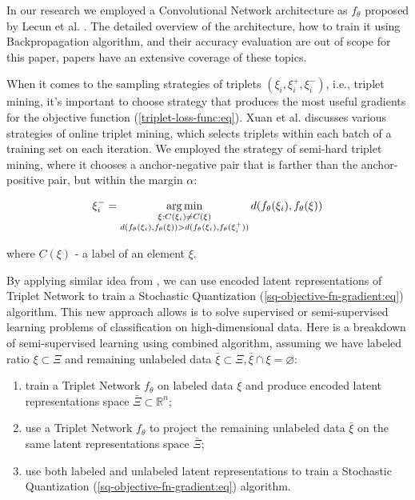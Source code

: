 In our research we employed a Convolutional Network architecture as $ f_{\theta} $ proposed by Lecun et al. \cite{Lecun_1998}. The detailed overview of the architecture, how to train it using Backpropagation algorithm, and their accuracy evaluation are out of scope for this paper, papers \cite{Beohar_2021,Krizhevsky_2012,Lecun_1998} have an extensive coverage of these topics.

When it comes to the sampling strategies of triplets $ (\xi_i, \xi^+_i, \xi^-_i) $, i.e., triplet mining, it's important to choose strategy that produces the most useful gradients for the objective function (\ref{triplet-loss-func:eq}). Xuan et al. \cite{xuan2020} discusses various strategies of online triplet mining, which selects triplets within each batch of a training set on each iteration. We employed the strategy of semi-hard triplet mining, where it chooses a anchor-negative pair that is farther than the anchor-positive pair, but within the margin $ \alpha $:

\begin{equation}
    \label{semi-hard-triplet-mining:eq}
    \xi^-_i = \operatorname*{arg\,min}_{\substack{\xi: C(\xi_i) \neq C(\xi) \\ d(f_{\theta}(\xi_i), f_{\theta}(\xi)) > d(f_{\theta}(\xi_i), f_{\theta}(\xi^+_i))}} d(f_{\theta}(\xi_i), f_{\theta}(\xi))
\end{equation}

\noindent where $ C(\xi) $ - a label of an element $ \xi $.

By applying similar idea from \cite{Hoffer_2015,MURASAKI_ANDO_SHIMAMURA_2022,Turpault_Serizel_Vincent_2019}, we can use encoded latent representations of Triplet Network to train a Stochastic Quantization (\ref{sq-objective-fn-gradient:eq}) algorithm. This new approach allows is to solve supervised or semi-supervised learning problems of classification on high-dimensional data. Here is a breakdown of semi-supervised learning using combined algorithm, assuming we have labeled ratio $ \xi \subset \Xi $ and remaining unlabeled data $ \bar{\xi} \subset \Xi, \bar{\xi} \cap \xi = \varnothing $:

\begin{enumerate}
    \item train a Triplet Network $ f_{\theta} $ on labeled data $ \xi $ and produce encoded latent representations space $ \bar{\Xi} \subset \mathbb{R}^n $;
    \item use a Triplet Network $ f_{\theta} $ to project the remaining unlabeled data $ \bar{\xi} $ on the same latent representations space $ \bar{\Xi} $;
    \item use both labeled and unlabeled latent representations to train a Stochastic Quantization (\ref{sq-objective-fn-gradient:eq}) algorithm.
\end{enumerate}
